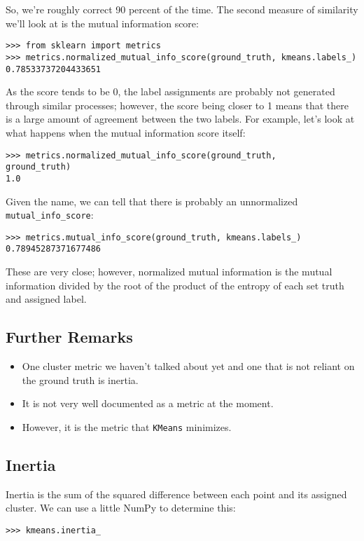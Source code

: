 \documentclass[SKL-MASTER.tex]{subfiles}
\begin{document}
So, we're roughly correct 90 percent of the time. The second measure of similarity we'll look
at is the mutual information score:
\begin{framed}
\begin{verbatim}
>>> from sklearn import metrics
>>> metrics.normalized_mutual_info_score(ground_truth, kmeans.labels_)
0.78533737204433651
\end{verbatim}
\end{framed}
As the score tends to be 0, the label assignments are probably not generated through
similar processes; however, the score being closer to 1 means that there is a large
amount of agreement between the two labels.
For example, let's look at what happens when the mutual information score itself:
\begin{framed}
\begin{verbatim}
>>> metrics.normalized_mutual_info_score(ground_truth, 
ground_truth)
1.0
\end{verbatim}
\end{framed}
Given the name, we can tell that there is probably an unnormalized \texttt{mutual\_info\_score}:
\begin{framed}
\begin{verbatim}
>>> metrics.mutual_info_score(ground_truth, kmeans.labels_)
0.78945287371677486
\end{verbatim}
\end{framed}
These are very close; however, normalized mutual information is the mutual information
divided by the root of the product of the entropy of each set truth and assigned label.
\subsection*{Further Remarks} %
\begin{itemize}
\item One cluster metric we haven't talked about yet and one that is not reliant on the ground truth
is inertia. 
\item It is not very well documented as a metric at the moment. 
\item However, it is the metric
that \texttt{KMeans} minimizes.
\end{itemize}
\subsection*{Inertia}
Inertia is the sum of the squared difference between each point and its assigned cluster.
We can use a little NumPy to determine this:
\begin{framed}
	\begin{verbatim}
>>> kmeans.inertia_
\end{verbatim}
\end{framed}
\end{document}
